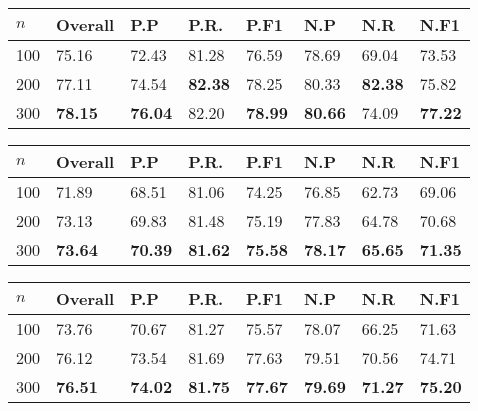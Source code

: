 \documentclass{acm_proc_article-sp}
\begin{document}
\vspace{-3mm}
\tabcolsep=0.11cm
\begin{tabular}{| l | l | l | l | l | l | l | l |}
\hline
$n$ & Overall & P.P & P.R. & P.F1 & N.P & N.R & N.F1 \\ \hline
100 & 75.16 & 72.43 & 81.28 & 76.59 & 78.69 & 69.04 & 73.53 \\ \hline
200 & 77.11 & 74.54 & \bf{82.38} & 78.25 & 80.33 & \bf{82.38} & 75.82 \\ \hline
300 & \bf{78.15} & \bf{76.04} & 82.20 & \bf{78.99} & \bf{80.66} & 74.09 & \bf{77.22} \\ \hline
\end{tabular} 

\vspace{-3mm}
\tabcolsep=0.11cm
\begin{tabular}{| l | l | l | l | l | l | l | l |}
\hline
$n$ & Overall & P.P & P.R. & P.F1 & N.P & N.R & N.F1 \\ \hline
100 & 71.89 & 68.51 & 81.06 & 74.25 & 76.85 & 62.73 & 69.06 \\ \hline
200 & 73.13 & 69.83 & 81.48 & 75.19 & 77.83 & 64.78 & 70.68 \\ \hline
300 & \bf{73.64} & \bf{70.39} & \bf{81.62} & \bf{75.58} & \bf{78.17} & \bf{65.65} & \bf{71.35} \\ \hline
\end{tabular}

\vspace{-3mm}
\tabcolsep=0.11cm
\begin{tabular}{| l | l | l | l | l | l | l | l |}
\hline
$n$ & Overall & P.P & P.R. & P.F1 & N.P & N.R & N.F1 \\ \hline
100 & 73.76 & 70.67 & 81.27 & 75.57 & 78.07 & 66.25 & 71.63 \\ \hline
200 & 76.12 & 73.54 & 81.69 & 77.63 & 79.51 & 70.56 & 74.71\\ \hline
300 & \bf{76.51} & \bf{74.02} & \bf{81.75} & \bf{77.67} & \bf{79.69} & \bf{71.27} & \bf{75.20} \\ \hline
\end{tabular} 
\newpage
\end{document}
